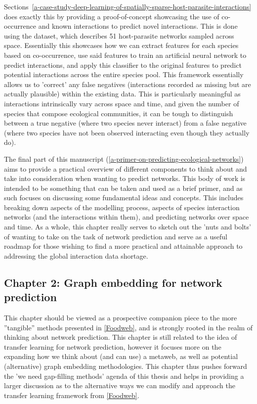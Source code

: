 \begin{refsection}
Sections~\ref{a-case-study-deep-learning-of-spatially-sparse-host-parasite-interactions} does exactly this by providing a proof-of-concept showcasing the use of co-occurrence and known interactions to predict novel interactions. This is done using the \cite{Hadfield2014TalTwo} dataset, which describes 51 host-parasite networks sampled across space. Essentially this showcases how we can extract features for each species based on co-occurrence, use said features to train an artificial neural network to predict interactions, and apply this classifier to the original features to predict potential interactions across the entire species pool. This framework essentially allows us to 'correct' any false negatives (interactions recorded as missing but are actually plausible) within the existing data. This is particularly meaningful as interactions intrinsically vary across space and time, and given the number of species that compose ecological communities, it can be tough to distinguish between a true negative (where two species never interact) from a false negative (where two species have not been observed interacting even though they actually do).

The final part of this manuscript (\autoref{a-primer-on-predicting-ecological-networks}) aims to provide a practical overview of different components to think about and take into consideration when wanting to predict networks. This body of work is intended to be something that can be taken and used as a brief primer, and as such focuses on discussing some fundamental ideas and concepts. This includes breaking down aspects of the modelling process, aspects of species interaction networks (and the interactions within them), and predicting networks over space and time. As a whole, this chapter really serves to sketch out the 'nuts and bolts' of wanting to take on the task of network prediction and serve as a useful roadmap for those wishing to find a more practical and attainable approach to addressing the global interaction data shortage.

\subsection{Chapter 2: Graph embedding for network prediction}

This chapter should be viewed as a prospective companion piece to the more ''tangible'' methods presented in \autoref{Foodweb}, and is strongly rooted in the realm of thinking about network prediction. This chapter is still related to the idea of transfer learning for network prediction, however it focuses more on the expanding how we think about (and can use) a metaweb, as well as potential (alternative) graph embedding methodologies. This chapter thus pushes forward the 'we need gap-filling methods' agenda of this thesis and helps in providing a larger discussion as to the alternative ways we can modify and approach the transfer learning framework from \autoref{Foodweb}.


\end{refsection}
